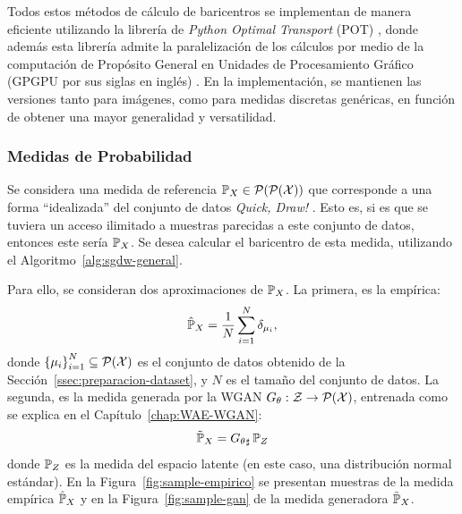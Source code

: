 Todos estos métodos de cálculo de baricentros se implementan de manera eficiente utilizando la librería de \textit{Python Optimal Transport} (POT) \cite{flamary2021pot}, donde además esta librería admite la paralelización de los cálculos por medio de la computación de Propósito General en Unidades de Procesamiento Gráfico (GPGPU por sus siglas en inglés) \cite{owens2008gpu}. En la implementación, se mantienen las versiones tanto para imágenes, como para medidas discretas genéricas, en función de obtener una mayor generalidad y versatilidad.

\subsubsection{Medidas de Probabilidad}\label{sssec:medidas}  %

Se considera una medida de referencia $\Prob_X \in \ProbSpace[\ProbSpace[\cX]]$ que corresponde a una forma ``idealizada'' del conjunto de datos \textit{Quick, Draw!} \cite{jongejan2016quick}. Esto es, si es que se tuviera un acceso ilimitado a muestras parecidas a este conjunto de datos, entonces este sería $\Prob_X$. Se desea calcular el baricentro de esta medida, utilizando el Algoritmo~\ref{alg:sgdw-general}.

Para ello, se consideran dos aproximaciones de $\Prob_X$. La primera, es la empírica:
\begin{equation}\label{eq:medida-empirica-quick-draw}
    \hat \Prob_X = \frac{1}{N} \sum_{i=1}^{N} \delta_{\mu_i},
\end{equation}
donde $\left\{ \mu_i \right\}_{i=1}^{N} \subseteq \ProbSpace[\cX] $ es el conjunto de datos obtenido de la Sección~\ref{ssec:preparacion-dataset}, y $N$ es el tamaño del conjunto de datos. La segunda, es la medida generada por la WGAN $G_\theta : \cZ \to \ProbSpace[\cX]$, entrenada como se explica en el Capítulo~\ref{chap:WAE-WGAN}:
\begin{equation}
    \tilde \Prob_X
    = \pf{G_\theta} \Prob_Z
\end{equation}
donde $\Prob_Z$ es la medida del espacio latente (en este caso, una distribución normal estándar). En la Figura~\ref{fig:sample-empirico} se presentan muestras de la medida empírica $\hat\Prob_X$ y en la Figura~\ref{fig:sample-gan} de la medida generadora $\tilde\Prob_X$.


